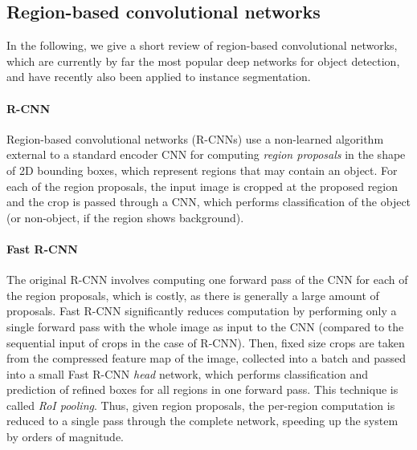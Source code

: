 


\subsection{Region-based convolutional networks}
In the following, we give a short review of region-based convolutional networks, which are currently by far the
most popular deep networks for object detection, and have recently also been applied to instance segmentation.

\paragraph{R-CNN}
Region-based convolutional networks (R-CNNs) \cite{RCNN} use a non-learned algorithm external to a standard encoder CNN
for computing \emph{region proposals} in the shape of 2D bounding boxes, which represent regions that may contain an object.
For each of the region proposals, the input image is cropped at the proposed region and the crop is
passed through a CNN, which performs classification of the object (or non-object, if the region shows background). %

\paragraph{Fast R-CNN}
The original R-CNN involves computing one forward pass of the CNN for each of the region proposals,
which is costly, as there is generally a large amount of proposals.
Fast R-CNN \cite{FastRCNN} significantly reduces computation by performing only a single forward pass with the whole image
as input to the CNN (compared to the sequential input of crops in the case of R-CNN).
Then, fixed size crops are taken from the compressed feature map of the image,
collected into a batch and passed into a small Fast R-CNN
\emph{head} network, which performs classification and prediction of refined boxes for all regions in one forward pass.
This technique is called \emph{RoI pooling}. %
Thus, given region proposals, the per-region computation is reduced to a single pass through the complete network,
speeding up the system by orders of magnitude. %

